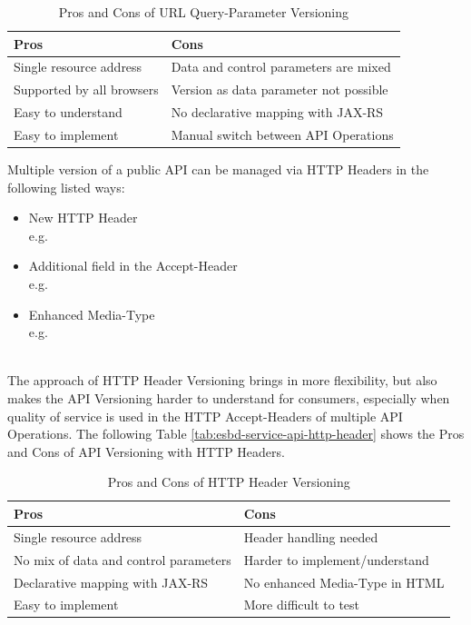 {\renewcommand{\arraystretch}{1.2}%
	\begin{table}[h]
		\begin{tabularx}{\textwidth}{ X|X }	
			\textbf{Pros}                 & \textbf{Cons}    \\  \hline
			Single resource address       & Data and control parameters are mixed  \\  
			Supported by all browsers     & Version as data parameter not possible \\
			Easy to understand            & No declarative mapping with JAX-RS     \\
			Easy to implement             & Manual switch between API Operations   \\ \hline
		\end{tabularx}
		\caption{Pros and Cons of URL Query-Parameter Versioning}
		\label{tab:esbd-service-api-query-param}
\end{table}}

Multiple version of a public API can be managed via HTTP Headers in the following listed ways:
\begin{itemize}
	\item New HTTP Header \\
	e.g. 
	\item Additional field in the Accept-Header \\
	e.g. 
	\item Enhanced Media-Type \\
	e.g. 
\end{itemize}
\ \\
The approach of HTTP Header Versioning brings in more flexibility, but also makes the API Versioning harder to understand for consumers, especially when quality of service is used in the HTTP Accept-Headers of multiple API Operations. The following Table \vref{tab:esbd-service-api-http-header} shows the Pros and Cons of API Versioning with HTTP Headers.

{\renewcommand{\arraystretch}{1.2}%
\begin{table}[h]
	\begin{tabularx}{\textwidth}{ X|X }	
		\textbf{Pros}                         & \textbf{Cons}    \\  \hline
		Single resource address               & Header handling needed     \\  
		No mix of data and control parameters & Harder to implement/understand     \\
		Declarative mapping with JAX-RS       & No enhanced Media-Type in HTML     \\
		Easy to implement                     & More difficult to test \\ \hline
	\end{tabularx}
	\caption{Pros and Cons of HTTP Header Versioning}
	\label{tab:esbd-service-api-http-header}
\end{table}}

